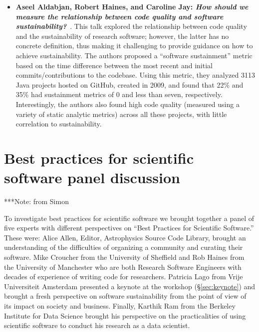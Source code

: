 \documentclass[11pt, oneside]{amsart}
\newcommand{\note}[1]{ {\textcolor{blueish}    { ***Note:      #1 }}}
\begin{document}
\begin{itemize}[itemsep=1ex]
    \item \textbf{Aseel Aldabjan, Robert Haines, and
    Caroline Jay\textsuperscript{\textasteriskcentered}: \textit{How should we
    measure the relationship between code quality and software
    sustainability?}}~\cite{Aldabjan:2016ws}.
    This talk explored the relationship between code quality and the sustainability
    of research software; however, the latter has no concrete definition, thus making
    it challenging to provide guidance on how to achieve sustainability. The authors
    proposed a ``software sustainment'' metric based on the time difference between
    the most recent and initial commits\slash contributions to the codebase.
    Using this metric, they analyzed 3113 Java projects hosted on GitHub, created
    in 2009, and found that 22\% and 35\% had sustainment metrics of 0 and less
    than seven, respectively. Interestingly, the authors also found high
    code quality (measured using a variety of static analytic metrics) across
    all these projects, with little correlation to sustainability.


\end{itemize}

\section{Best practices for scientific software panel discussion} \label{sec:panel}

\note{from Simon}

To investigate best practices for scientific software we brought together a panel of five experts with different perspectives on ``Best Practices for Scientific Software.''
These were: Alice Allen, Editor, Astrophysics Source Code Library, brought an understanding of the difficulties of organizing a community and curating their software.
Mike Croucher from the University of Sheffield and Rob Haines from the University of Manchester who are both Research Software Engineers with decades of experience of writing code for researchers.
Patricia Lago from Vrije Universiteit Amsterdam presented a keynote at the workshop (\S\ref{sec:keynote}) and brought a fresh perspective on software sustainability from the point of view of its impact on society and business.
Finally, Karthik Ram from the Berkeley Institute for Data Science brought his perspective on the practicalities of using scientific software to conduct his research as a data scientist.
\end{document}
